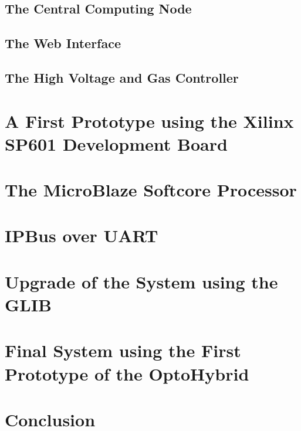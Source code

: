     \subsection{The Central Computing Node}

    \subsection{The Web Interface}

    \subsection{The High Voltage and Gas Controller}

  \section{A First Prototype using the Xilinx SP601 Development Board}

    \section{The MicroBlaze Softcore Processor}

    \section{IPBus over UART}

  \section{Upgrade of the System using the GLIB}

  \section{Final System using the First Prototype of the OptoHybrid}

  \section{Conclusion}
